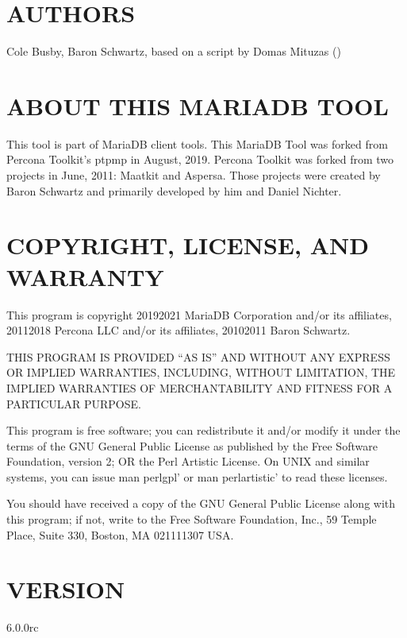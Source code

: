 \documentclass[letterpaper,10pt,english]{sphinxmanual}
\begin{document}
\section{AUTHORS}
\label{\detokenize{mariadb-stacktrace:authors}}
Cole Busby, Baron Schwartz, based on a script by Domas Mituzas ()


\section{ABOUT THIS MARIADB TOOL}
\label{\detokenize{mariadb-stacktrace:about-this-mariadb-tool}}
This tool is part of MariaDB client tools. This MariaDB Tool was forked from
Percona Toolkit’s pt\sphinxhyphen{}pmp in August, 2019. Percona Toolkit was forked from two
projects in June, 2011: Maatkit and Aspersa.  Those projects were created by
Baron Schwartz and primarily developed by him and Daniel Nichter.


\section{COPYRIGHT, LICENSE, AND WARRANTY}
\label{\detokenize{mariadb-stacktrace:copyright-license-and-warranty}}
This program is copyright 2019\sphinxhyphen{}2021 MariaDB Corporation and/or its affiliates,
2011\sphinxhyphen{}2018 Percona LLC and/or its affiliates, 2010\sphinxhyphen{}2011 Baron Schwartz.

THIS PROGRAM IS PROVIDED “AS IS” AND WITHOUT ANY EXPRESS OR IMPLIED
WARRANTIES, INCLUDING, WITHOUT LIMITATION, THE IMPLIED WARRANTIES OF
MERCHANTABILITY AND FITNESS FOR A PARTICULAR PURPOSE.

This program is free software; you can redistribute it and/or modify it under
the terms of the GNU General Public License as published by the Free Software
Foundation, version 2; OR the Perl Artistic License.  On UNIX and similar
systems, you can issue \textasciigrave{}man perlgpl’ or \textasciigrave{}man perlartistic’ to read these
licenses.

You should have received a copy of the GNU General Public License along with
this program; if not, write to the Free Software Foundation, Inc., 59 Temple
Place, Suite 330, Boston, MA  02111\sphinxhyphen{}1307  USA.


\section{VERSION}
\label{\detokenize{mariadb-stacktrace:version}}
 6.0.0rc
\end{document}
